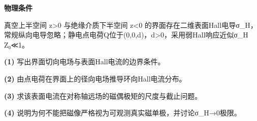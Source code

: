 \textbf{物理条件}\par 真空上半空间 z>0 与绝缘介质下半空间 z<0 的界面存在二维表面Hall电导σ\_H，常规纵向电导忽略；静电点电荷Q位于(0,0,d)，d>0，采用弱Hall响应近似σ\_H Z₀≪1。
\par\noindent\textbf{(1)} 写出界面切向电场与表面Hall电流的边界条件。
\par\noindent\textbf{(2)} 由点电荷在界面上的径向电场推导环向Hall电流分布。
\par\noindent\textbf{(3)} 求该表面电流在对称轴远场的磁偶极矩的尺度与截止问题。
\par\noindent\textbf{(4)} 说明为何不能把磁像严格视为可观测真实磁单极，并讨论σ\_H→0极限。
